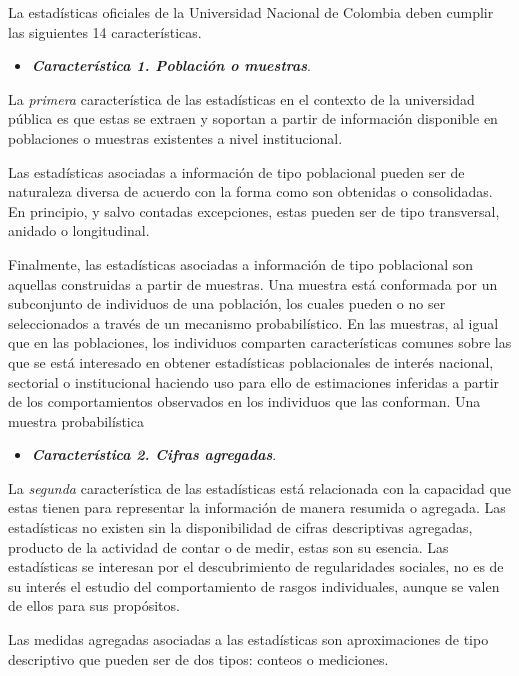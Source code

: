 \documentclass[
]{book}
\providecommand{\tightlist}{%
  \setlength{\itemsep}{0pt}\setlength{\parskip}{0pt}}
\begin{document}
La estadísticas oficiales de la Universidad Nacional de Colombia deben cumplir las siguientes 14 características.

\begin{itemize}
\tightlist
\item
  \textbf{\emph{Característica 1. Población o muestras}}.
\end{itemize}

La \emph{primera} característica de las estadísticas en el contexto de la universidad pública es que estas se extraen y soportan a partir de información disponible en poblaciones o muestras existentes a nivel institucional.

Las estadísticas asociadas a información de tipo poblacional pueden ser de naturaleza diversa de acuerdo con la forma como son obtenidas o consolidadas. En principio, y salvo contadas excepciones, estas pueden ser de tipo transversal, anidado o longitudinal.

Finalmente, las estadísticas asociadas a información de tipo poblacional son aquellas construidas a partir de muestras. Una muestra está conformada por un subconjunto de individuos de una población, los cuales pueden o no ser seleccionados a través de un mecanismo probabilístico. En las muestras, al igual que en las poblaciones, los individuos comparten características comunes sobre las que se está interesado en obtener estadísticas poblacionales de interés nacional, sectorial o institucional haciendo uso para ello de estimaciones inferidas a partir de los comportamientos observados en los individuos que las conforman. Una muestra probabilística

\begin{itemize}
\tightlist
\item
  \textbf{\emph{Característica 2. Cifras agregadas}}.
\end{itemize}

La \emph{segunda} característica de las estadísticas está relacionada con la capacidad que estas tienen para representar la información de manera resumida o agregada. Las estadísticas no existen sin la disponibilidad de cifras descriptivas agregadas, producto de la actividad de contar o de medir, estas son su esencia. Las estadísticas se interesan por el descubrimiento de regularidades sociales, no es de su interés el estudio del comportamiento de rasgos individuales, aunque se valen de ellos para sus propósitos.

Las medidas agregadas asociadas a las estadísticas son aproximaciones de tipo descriptivo que pueden ser de dos tipos: conteos o mediciones.
\end{document}
